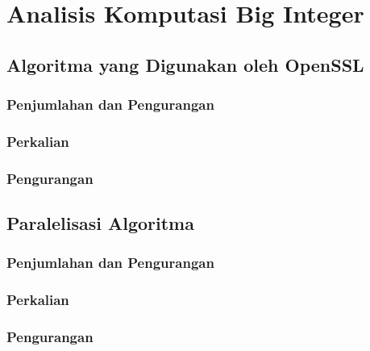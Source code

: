 \section{Analisis Komputasi Big Integer}

\subsection{Algoritma yang Digunakan oleh OpenSSL}
\subsubsection{Penjumlahan dan Pengurangan}
\subsubsection{Perkalian}
\subsubsection{Pengurangan}

\subsection{Paralelisasi Algoritma}
\subsubsection{Penjumlahan dan Pengurangan}
\subsubsection{Perkalian}
\subsubsection{Pengurangan}
